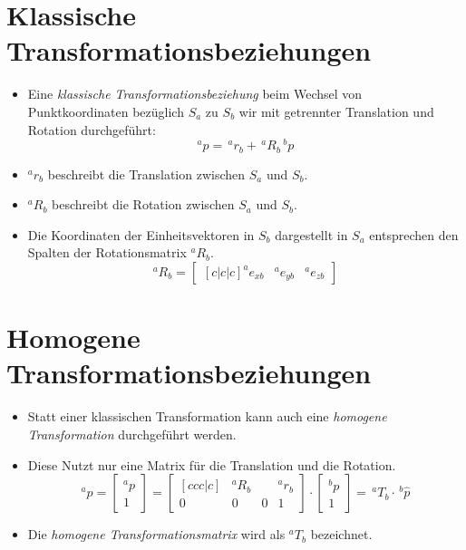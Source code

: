 	\section{Klassische Transformationsbeziehungen} %
		\begin{itemize}
			\item Eine \textit{klassische Transformationsbeziehung} beim Wechsel von Punktkoordinaten bezüglich \( S _ a \) zu \( S _ b \) wir mit getrennter Translation und Rotation durchgeführt:
				\begin{equation*}
					^ap = \,^ar_b + \,^aR_b \,^bp
				\end{equation*}
			\item \( ^ar_b \) beschreibt die Translation zwischen \( S _ a \) und \( S _ b \).
			\item \( ^aR_b \) beschreibt die Rotation zwischen \( S _ a \) und \( S _ b \).
			\item Die Koordinaten der Einheitsvektoren in \( S _ b \) dargestellt in \( S _ a \) entsprechen den Spalten der Rotationsmatrix \( ^aR_b \).
				\begin{equation*}
					^aR_b =
					\begin{bmatrix}[c|c|c]
						^ae_{xb} & ^ae_{yb} & ^ae_{zb}
					\end{bmatrix}
				\end{equation*}
		\end{itemize}

	\section{Homogene Transformationsbeziehungen} %
		\label{sec:homogeneMatrix}

		\begin{itemize}
			\item Statt einer klassischen Transformation kann auch eine \textit{homogene Transformation} durchgeführt werden.
			\item Diese Nutzt nur eine Matrix für die Translation und die Rotation.
				\begin{equation*}
					^a\hat{p} =
					\begin{bmatrix}
						^ap \\ \hline
						1
					\end{bmatrix}
					=
					\begin{bmatrix}[ccc|c]
						  & ^aR_b &   & ^ar_b \\ \hline
						0 & 0     & 0 & 1
					\end{bmatrix}
					\cdot
					\begin{bmatrix}
						^bp \\ \hline
						1
					\end{bmatrix}
					= \,^aT_b \cdot \,^b\hat{p}
				\end{equation*}
			\item Die \textit{homogene Transformationsmatrix} wird als \( ^aT_b \) bezeichnet.
		\end{itemize}

